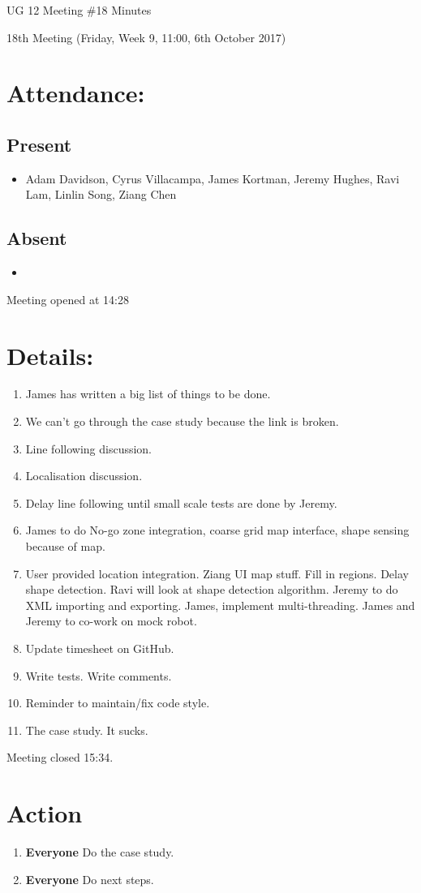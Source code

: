 \documentclass{article}
\begin{document}
\begin{adjustwidth}{2.5em}{0pt}
\begin{center}
\Large{UG 12 Meeting \#18 Minutes}\\
\end{center}
\end{adjustwidth}

18th Meeting (Friday, Week 9, 11:00, 6th October 2017)
\section{Attendance:}
\subsection*{Present}
\begin{itemize}
\item Adam Davidson, Cyrus Villacampa, James Kortman, Jeremy Hughes, Ravi Lam, Linlin Song, Ziang Chen
\end{itemize}
\subsection*{Absent}
\begin{itemize}
\item 
\end {itemize}

Meeting opened at 14:28
\section{Details:}
\begin{enumerate}
\item James has written a big list of things to be done.
\item We can’t go through the case study because the link is broken.
\item Line following discussion.
\item Localisation discussion.
\item Delay line following until small scale tests are done by Jeremy.
\item James to do No-go zone integration, coarse grid map interface, shape sensing because of map.
\item User provided location integration. Ziang UI map stuff. Fill in regions. Delay shape detection. Ravi will look at shape detection algorithm. Jeremy to do XML importing and exporting. James, implement multi-threading. James and Jeremy to co-work on mock robot.
\item Update timesheet on GitHub.
\item Write tests. Write comments.
\item Reminder to maintain/fix code style.
\item The case study. It sucks.
\end{enumerate}
Meeting closed 15:34.

\section{Action}
\begin{enumerate}
\item \textbf{Everyone} Do the case study.
\item \textbf{Everyone} Do next steps.
\end{enumerate}
\end{document}
